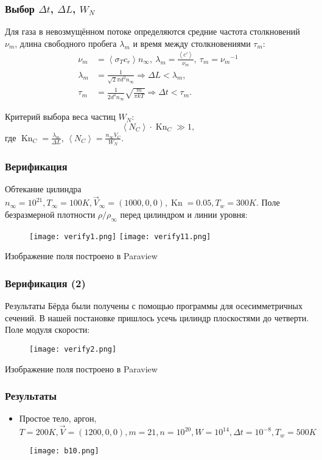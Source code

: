 \documentclass[onlymath]{beamer}
\newcommand\avg[1]{\left\langle{#1}\right\rangle}
\DeclareMathOperator\Kn{Kn}
\newcommand{\ts}{\Delta t}
\newcommand{\sps}{\Delta L}
\newcommand{\statw}{W_N}
\newcommand{\fp}{\lambda_m}
\newcommand{\ft}{\tau_m}
\newcommand{\cf}{\nu_m}
\newcommand{\ccs}{\sigma_T}
\newcommand\then{\Rightarrow}
\newcommand\flowvel{\vec{V}_{\infty}}
\newcommand\flowtemp{T_{\infty}}
\newcommand\flowcon{n_{\infty}}
\begin{document}
\begin{frame}
  \frametitle{Выбор $\ts$, $\sps$, $\statw$}
  Для газа в невозмущённом потоке определяются средние частота
  столкновений $\cf$, длина свободного пробега $\fp$ и время между
  столкновениями $\ft$:
    \begin{equation*}
      \begin{aligned}
        \cf &= \avg{\ccs c_r} \flowcon,\:\fp = \frac{\avg{c'}}{\cf},\:\ft = {\cf}^{-1}\\
        \fp &= \frac{1}{\sqrt{2} \pi d^2 \flowcon} \then \sps < \fp,\\
        \ft &= \frac{1}{2d^2 \flowcon}\sqrt{\frac{m}{\pi k T}} \then \ts < \ft.
      \end{aligned}
    \end{equation*}
  
    Критерий выбора веса частиц $\statw$:
    \begin{equation*}
      \avg{N_C}\cdot\Kn_C \gg 1,
    \end{equation*}
    где $\Kn_C = \frac{\fp}{\sps}$, $\avg{N_C} = \frac{\flowcon V_C}{W_N}$.
\end{frame}


\begin{frame}
  \frametitle{Верификация}
  Обтекание цилиндра $\flowcon = 10^{21}, \flowtemp = 100K, \flowvel =
  (1000, 0, 0), \Kn = 0.05, T_w = 300K$. Поле безразмерной плотности
  $\rho/\rho_{\infty}$ перед цилиндром и линии уровня:
  \begin{figure}
    \centering
    \texttt{[image: verify1.png]}
    \texttt{[image: verify11.png]}
  \end{figure}
  Изображение поля построено в Paraview
\end{frame}


\begin{frame}
  \frametitle{Верификация (2)}
  Результаты Бёрда были получены с помощью программы для
  осесимметричных сечений. В нашей постановке пришлось усечь цилиндр
  плоскостями до четверти. Поле модуля скорости:
  \begin{figure}
    \centering
    \texttt{[image: verify2.png]}
  \end{figure}
  Изображение поля построено в Paraview
\end{frame}


\begin{frame}
  \frametitle{Результаты}
  \begin{itemize}
  \item Простое тело, аргон, $T = 200K, \vec{V} = (1200, 0, 0), m =
    21, n = 10^{20}, W = 10^{14}, \Delta t = 10^{-8}, T_w = 500K$
  \end{itemize}
  \begin{figure}
    \centering
    \texttt{[image: b10.png]}
  \end{figure}
\end{frame}
\end{document}
